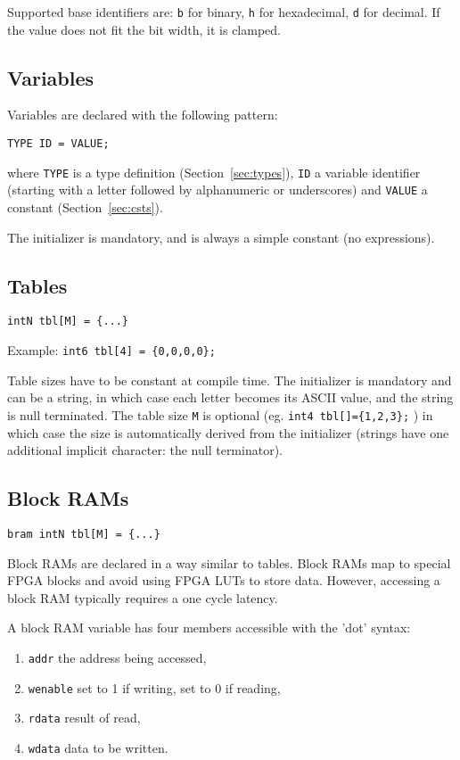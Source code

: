 \documentclass[a4]{article}
\begin{document}
Supported base identifiers are: \texttt{b} for binary, \texttt{h} for hexadecimal, \texttt{d} for decimal. If the value does not fit the bit width, it is clamped.

\subsection{Variables}

Variables are declared with the following pattern:

\texttt{TYPE ID = VALUE;}

\noindent where \texttt{TYPE} is a type definition (Section~\ref{sec:types}), \texttt{ID} a variable identifier (starting with a letter followed by alphanumeric or underscores) and \texttt{VALUE} a constant (Section~\ref{sec:csts}).

The initializer is mandatory, and is always a simple constant (no expressions).

\subsection{Tables}

\texttt{intN tbl[M] = \{...\} }

\noindent Example:  \texttt{int6 tbl[4] = \{0,0,0,0\};}

\noindent Table sizes have to be constant at compile time. The initializer is mandatory and can be a string, in which case each letter becomes its ASCII value, and the string is null terminated. The table size \texttt{M} is optional (eg. \texttt{int4 tbl[]=\{1,2,3\};} ) in which case the size is automatically derived from the initializer (strings have one additional implicit character: the null terminator).

\subsection{Block RAMs}

\texttt{bram intN tbl[M] = \{...\} }

\noindent Block RAMs are declared in a way similar to tables. Block RAMs map to special FPGA blocks and avoid using FPGA LUTs to store data. However, accessing a block RAM typically requires a one cycle latency.

A block RAM variable has four members accessible with the 'dot' syntax: 
\begin{enumerate}
	\item {\tt addr} the address being accessed,
	\item {\tt wenable} set to 1 if writing, set to 0 if reading,
	\item {\tt rdata} result of read,
	\item {\tt wdata} data to be written.
\end{enumerate}
\end{document}
